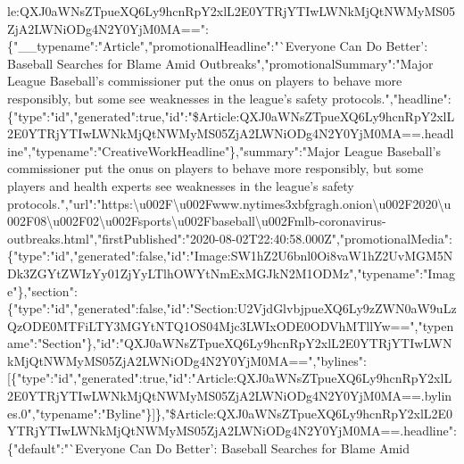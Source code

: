 le:QXJ0aWNsZTpueXQ6Ly9hcnRpY2xlL2E0YTRjYTIwLWNkMjQtNWMyMS05ZjA2LWNiODg4N2Y0YjM0MA==":\{"\_\_typename":"Article","promotionalHeadline":"`Everyone
Can Do Better': Baseball Searches for Blame Amid
Outbreaks","promotionalSummary":"Major League Baseball's commissioner
put the onus on players to behave more responsibly, but some see
weaknesses in the league's safety
protocols.","headline":\{"type":"id","generated":true,"id":"\$Article:QXJ0aWNsZTpueXQ6Ly9hcnRpY2xlL2E0YTRjYTIwLWNkMjQtNWMyMS05ZjA2LWNiODg4N2Y0YjM0MA==.headline","typename":"CreativeWorkHeadline"\},"summary":"Major
League Baseball's commissioner put the onus on players to behave more
responsibly, but some players and health experts see weaknesses in the
league's safety
protocols.","url":"https:\textbackslash{}u002F\textbackslash{}u002Fwww.nytimes3xbfgragh.onion\textbackslash{}u002F2020\textbackslash{}u002F08\textbackslash{}u002F02\textbackslash{}u002Fsports\textbackslash{}u002Fbaseball\textbackslash{}u002Fmlb-coronavirus-outbreaks.html","firstPublished":"2020-08-02T22:40:58.000Z","promotionalMedia":\{"type":"id","generated":false,"id":"Image:SW1hZ2U6bnl0Oi8vaW1hZ2UvMGM5NDk3ZGYtZWIzYy01ZjYyLTlhOWYtNmExMGJkN2M1ODMz","typename":"Image"\},"section":\{"type":"id","generated":false,"id":"Section:U2VjdGlvbjpueXQ6Ly9zZWN0aW9uLzQzODE0MTFiLTY3MGYtNTQ1OS04Mjc3LWIxODE0ODVhMTllYw==","typename":"Section"\},"id":"QXJ0aWNsZTpueXQ6Ly9hcnRpY2xlL2E0YTRjYTIwLWNkMjQtNWMyMS05ZjA2LWNiODg4N2Y0YjM0MA==","bylines":{[}\{"type":"id","generated":true,"id":"Article:QXJ0aWNsZTpueXQ6Ly9hcnRpY2xlL2E0YTRjYTIwLWNkMjQtNWMyMS05ZjA2LWNiODg4N2Y0YjM0MA==.bylines.0","typename":"Byline"\}{]}\},"\$Article:QXJ0aWNsZTpueXQ6Ly9hcnRpY2xlL2E0YTRjYTIwLWNkMjQtNWMyMS05ZjA2LWNiODg4N2Y0YjM0MA==.headline":\{"default":"`Everyone
Can Do Better': Baseball Searches for Blame Amid
